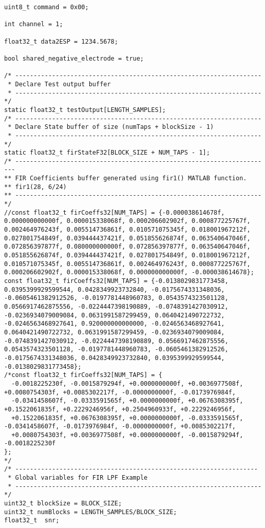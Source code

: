 \begin{lstlisting}[label=algoritmo:main.c,style = STM-code,frame=single,caption=main.c]
uint8_t command = 0x00;

int channel = 1;

float32_t data2ESP = 1234.5678;

bool shared_negative_electrode = true;

/* -------------------------------------------------------------------
 * Declare Test output buffer
 * ------------------------------------------------------------------- */
static float32_t testOutput[LENGTH_SAMPLES];
/* -------------------------------------------------------------------
 * Declare State buffer of size (numTaps + blockSize - 1)
 * ------------------------------------------------------------------- */
static float32_t firStateF32[BLOCK_SIZE + NUM_TAPS - 1];
/* ----------------------------------------------------------------------
** FIR Coefficients buffer generated using fir1() MATLAB function.
** fir1(28, 6/24)
** ------------------------------------------------------------------- */
//const float32_t firCoeffs32[NUM_TAPS] = {-0.000038614678f, 0.000000000000f, 0.000015338068f, 0.000206602902f, 0.000877225767f, 0.002464976243f, 0.005514736861f, 0.010571075345f, 0.018001967212f, 0.027801754849f, 0.039444437421f, 0.051855626874f, 0.063540647046f, 0.072856397877f, 0.080000000000f, 0.072856397877f, 0.063540647046f, 0.051855626874f, 0.039444437421f, 0.027801754849f, 0.018001967212f, 0.010571075345f, 0.005514736861f, 0.002464976243f, 0.000877225767f, 0.000206602902f, 0.000015338068f, 0.000000000000f, -0.000038614678};
const float32_t firCoeffs32[NUM_TAPS] = {-0.0138029831773458, 0.0395399929599544, 0.0428349923732840, -0.0175674331348036, -0.0605461382912526, -0.0197781448960783, 0.0543574323501128, 0.0566917462875556, -0.0224447398190889, -0.0748391427030912, -0.0236934079009084, 0.0631991587299459, 0.0640421490722732, -0.0246563468927641, 0.920000000000000, -0.0246563468927641, 0.0640421490722732, 0.0631991587299459, -0.0236934079009084, -0.0748391427030912, -0.0224447398190889, 0.0566917462875556, 0.0543574323501128, -0.0197781448960783, -0.0605461382912526, -0.0175674331348036, 0.0428349923732840, 0.0395399929599544, -0.0138029831773458};
/*const float32_t firCoeffs32[NUM_TAPS] = {
  -0.0018225230f, -0.0015879294f, +0.0000000000f, +0.0036977508f, +0.0080754303f, +0.0085302217f, -0.0000000000f, -0.0173976984f,
  -0.0341458607f, -0.0333591565f, +0.0000000000f, +0.0676308395f, +0.1522061835f, +0.2229246956f, +0.2504960933f, +0.2229246956f,
  +0.1522061835f, +0.0676308395f, +0.0000000000f, -0.0333591565f, -0.0341458607f, -0.0173976984f, -0.0000000000f, +0.0085302217f,
  +0.0080754303f, +0.0036977508f, +0.0000000000f, -0.0015879294f, -0.0018225230f
};
*/
/* ------------------------------------------------------------------
 * Global variables for FIR LPF Example
 * ------------------------------------------------------------------- */
uint32_t blockSize = BLOCK_SIZE;
uint32_t numBlocks = LENGTH_SAMPLES/BLOCK_SIZE;
float32_t  snr;
	

\end{lstlisting}
